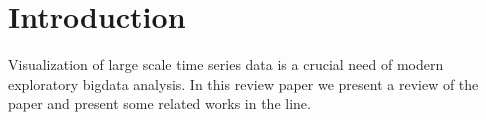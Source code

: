 \section{Introduction} \label{intro}
Visualization of large scale time series data is a crucial need of modern exploratory
bigdata analysis. In this review paper we present a review of the paper \cite{jugel2014m4} and present some related works in the line.  
